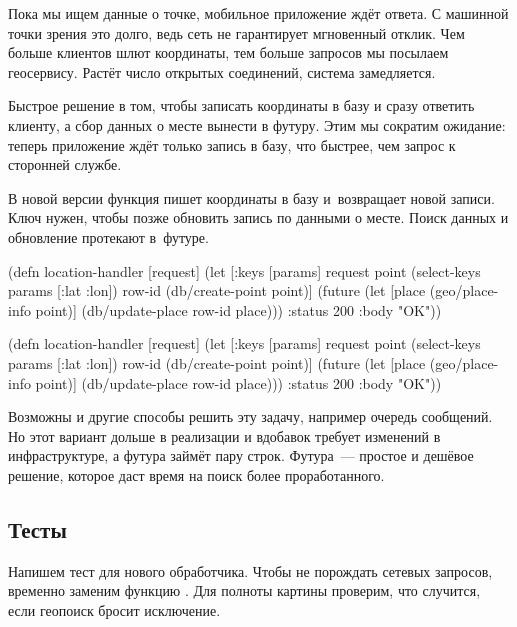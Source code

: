 Пока мы ищем данные о точке, мобильное приложение ждёт ответа. С машинной точки
зрения это долго, ведь сеть не гарантирует мгновенный отклик. Чем больше
клиентов шлют координаты, тем больше запросов мы посылаем геосервису. Растёт
число открытых соединений, система замедляется.


Быстрое решение в том, чтобы записать координаты в базу и сразу ответить
клиенту, а сбор данных о месте вынести в футуру. Этим мы сократим ожидание:
теперь приложение ждёт только запись в базу, что быстрее, чем запрос к сторонней
службе.

В новой версии функция  пишет координаты в базу
и~возвращает  новой записи. Ключ нужен, чтобы позже обновить запись по
 данными о месте. Поиск данных и обновление протекают в~футуре.

\ifnarrow

\begin{clojure}
(defn location-handler
  [request]
  (let [{:keys [params]} request
        point (select-keys params
                [:lat :lon])
        row-id (db/create-point point)]
    (future
      (let [place (geo/place-info
                    point)]
        (db/update-place row-id place)))
    {:status 200 :body "OK"}))
\end{clojure}

\else

\begin{clojure}
(defn location-handler
  [request]
  (let [{:keys [params]} request
        point (select-keys params [:lat :lon])
        row-id (db/create-point point)]
    (future
      (let [place (geo/place-info point)]
        (db/update-place row-id place)))
    {:status 200 :body "OK"}))
\end{clojure}

\fi

Возможны и другие способы решить эту задачу, например очередь сообщений. Но этот
вариант дольше в реализации и вдобавок требует изменений в инфраструктуре, а
футура займёт пару строк. Футура~--- простое и дешёвое решение, которое даст
время на поиск более проработанного.

\subsection{Тесты}


Напишем тест для нового обработчика. Чтобы не порождать сетевых запросов,
временно заменим функцию . Для полноты картины проверим,
что случится, если геопоиск бросит исключение.

